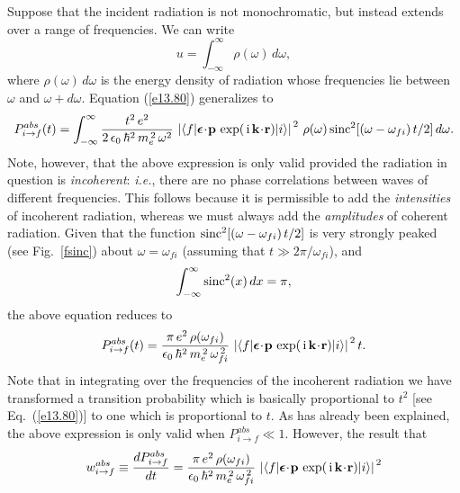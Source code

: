 Suppose   that the incident radiation is not monochromatic, but instead
extends over a range of frequencies. We can write
\begin{equation}
u = \int_{-\infty}^{\infty} \rho(\omega)\,d\omega,
\end{equation}
where $\rho(\omega)\,d\omega$ is the energy density of radiation whose frequencies lie between $\omega$ and $\omega+d\omega$. 
Equation (\ref{e13.80}) generalizes to
\begin{equation}
P_{i\rightarrow f}^{abs}(t) = \int_{-\infty}^\infty\frac{t^2\,e^2}{2\,\epsilon_0\,\hbar^2\,m_e^{\,2}\,\omega^2}\,\left|\langle f|\mbox{\boldmath$\epsilon$}\!\cdot\!{\bf p}\,\exp(\,{\rm i}\,{\bf k}\!\cdot\!{\bf r})|i\rangle\right|^{\,2}\,\rho(\omega)\,{\rm sinc}^2[(\omega-\omega_{fi})\,t/2]\,d\omega.
\end{equation}
Note, however, that the above expression is only valid provided the radiation
in question is {\em incoherent}: {\em i.e.}, there are no phase correlations between
waves of different frequencies. This follows because it is permissible to add the 
{\em intensities}\/ of incoherent radiation, whereas we must always add the
{\em amplitudes}\/ of coherent radiation.
Given that the function ${\rm sinc}^2[(\omega-\omega_{fi})\,t/2]$  is very strongly peaked (see Fig.~\ref{fsinc}) about $\omega=\omega_{fi}$ (assuming that $t\gg 2\pi/\omega_{fi}$), and
\begin{equation}
\int_{-\infty}^\infty {\rm sinc}^2(x)\,dx = \pi,
\end{equation}
the above equation reduces to
\begin{equation}\label{e13.86}
P_{i\rightarrow f}^{abs}(t) =\frac{\pi\,e^2\,\rho(\omega_{fi})}{\epsilon_0\,\hbar^2\,m_e^{\,2}\,\omega_{fi}^{\,2}}\,\left|\langle f|\mbox{\boldmath$\epsilon$}\!\cdot\!{\bf p}\,\exp(\,{\rm i}\,{\bf k}\!\cdot\!{\bf r})|i\rangle\right|^{\,2}t.
\end{equation}
Note that in integrating over the frequencies of
the incoherent radiation we have transformed a transition
probability which is basically proportional to $t^2$ [see Eq.~(\ref{e13.80})] to one which is proportional to $t$. As has
already been explained, the above expression is only valid when
$P_{i\rightarrow f}^{abs}\ll 1$. However, the result that
\begin{equation}
w_{i\rightarrow f}^{abs} \equiv \frac{dP^{abs}_{i\rightarrow f}}{dt} =
\frac{\pi\,e^2\,\rho(\omega_{fi})}{\epsilon_0\,\hbar^2\,m_e^{\,2}\,\omega_{fi}^{\,2}}\,\left|\langle f|\mbox{\boldmath$\epsilon$}\!\cdot\!{\bf p}\,\exp(\,{\rm i}\,{\bf k}\!\cdot\!{\bf r})|i\rangle\right|^{\,2}
\end{equation}
